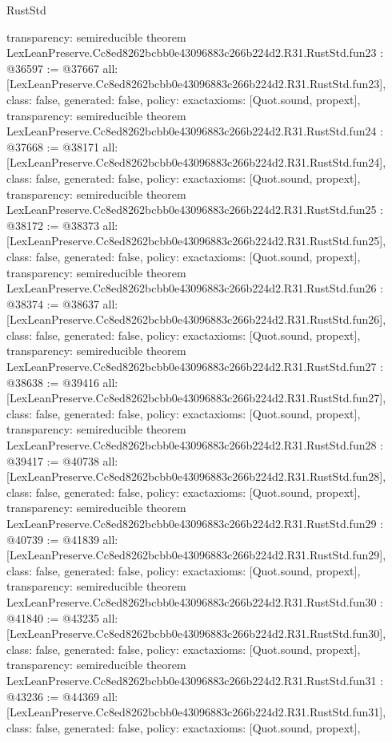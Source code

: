 \begin{lexlean}{RustStd}
\begin{coremodule}
{  transparency: semireducible
}
theorem LexLeanPreserve.Cc8ed8262bcbb0e43096883c266b224d2.R31.RustStd.fun23 : @36597 := @37667 {
  all: [LexLeanPreserve.Cc8ed8262bcbb0e43096883c266b224d2.R31.RustStd.fun23],
  class: false,
  generated: false,
  policy: exact{axioms: [Quot.sound, propext]},
  transparency: semireducible
}
theorem LexLeanPreserve.Cc8ed8262bcbb0e43096883c266b224d2.R31.RustStd.fun24 : @37668 := @38171 {
  all: [LexLeanPreserve.Cc8ed8262bcbb0e43096883c266b224d2.R31.RustStd.fun24],
  class: false,
  generated: false,
  policy: exact{axioms: [Quot.sound, propext]},
  transparency: semireducible
}
theorem LexLeanPreserve.Cc8ed8262bcbb0e43096883c266b224d2.R31.RustStd.fun25 : @38172 := @38373 {
  all: [LexLeanPreserve.Cc8ed8262bcbb0e43096883c266b224d2.R31.RustStd.fun25],
  class: false,
  generated: false,
  policy: exact{axioms: [Quot.sound, propext]},
  transparency: semireducible
}
theorem LexLeanPreserve.Cc8ed8262bcbb0e43096883c266b224d2.R31.RustStd.fun26 : @38374 := @38637 {
  all: [LexLeanPreserve.Cc8ed8262bcbb0e43096883c266b224d2.R31.RustStd.fun26],
  class: false,
  generated: false,
  policy: exact{axioms: [Quot.sound, propext]},
  transparency: semireducible
}
theorem LexLeanPreserve.Cc8ed8262bcbb0e43096883c266b224d2.R31.RustStd.fun27 : @38638 := @39416 {
  all: [LexLeanPreserve.Cc8ed8262bcbb0e43096883c266b224d2.R31.RustStd.fun27],
  class: false,
  generated: false,
  policy: exact{axioms: [Quot.sound, propext]},
  transparency: semireducible
}
theorem LexLeanPreserve.Cc8ed8262bcbb0e43096883c266b224d2.R31.RustStd.fun28 : @39417 := @40738 {
  all: [LexLeanPreserve.Cc8ed8262bcbb0e43096883c266b224d2.R31.RustStd.fun28],
  class: false,
  generated: false,
  policy: exact{axioms: [Quot.sound, propext]},
  transparency: semireducible
}
theorem LexLeanPreserve.Cc8ed8262bcbb0e43096883c266b224d2.R31.RustStd.fun29 : @40739 := @41839 {
  all: [LexLeanPreserve.Cc8ed8262bcbb0e43096883c266b224d2.R31.RustStd.fun29],
  class: false,
  generated: false,
  policy: exact{axioms: [Quot.sound, propext]},
  transparency: semireducible
}
theorem LexLeanPreserve.Cc8ed8262bcbb0e43096883c266b224d2.R31.RustStd.fun30 : @41840 := @43235 {
  all: [LexLeanPreserve.Cc8ed8262bcbb0e43096883c266b224d2.R31.RustStd.fun30],
  class: false,
  generated: false,
  policy: exact{axioms: [Quot.sound, propext]},
  transparency: semireducible
}
theorem LexLeanPreserve.Cc8ed8262bcbb0e43096883c266b224d2.R31.RustStd.fun31 : @43236 := @44369 {
  all: [LexLeanPreserve.Cc8ed8262bcbb0e43096883c266b224d2.R31.RustStd.fun31],
  class: false,
  generated: false,
  policy: exact{axioms: [Quot.sound, propext]},
}
\end{coremodule}
\end{lexlean}
